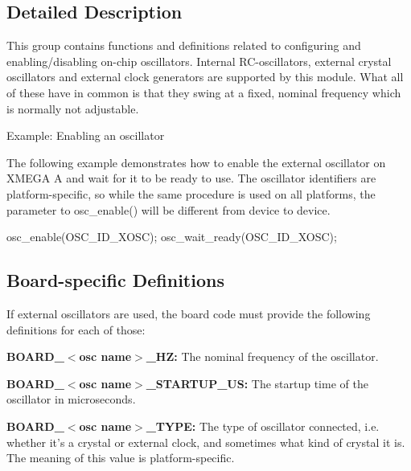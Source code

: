 \subsection{\-Detailed \-Description}
\-This group contains functions and definitions related to configuring and enabling/disabling on-\/chip oscillators. \-Internal \-R\-C-\/oscillators, external crystal oscillators and external clock generators are supported by this module. \-What all of these have in common is that they swing at a fixed, nominal frequency which is normally not adjustable.

\begin{DoxyParagraph}{\-Example\-: \-Enabling an oscillator}

\end{DoxyParagraph}
\-The following example demonstrates how to enable the external oscillator on \-X\-M\-E\-G\-A \-A and wait for it to be ready to use. \-The oscillator identifiers are platform-\/specific, so while the same procedure is used on all platforms, the parameter to osc\-\_\-enable() will be different from device to device. 
\begin{DoxyCode}
        osc_enable(OSC_ID_XOSC);
        osc_wait_ready(OSC_ID_XOSC); 
\end{DoxyCode}
\hypertarget{group__osc__group_osc_group_board}{}\subsection{\-Board-\/specific Definitions}\label{group__osc__group_osc_group_board}
\-If external oscillators are used, the board code must provide the following definitions for each of those\-:
\begin{DoxyItemize}
\item {\bfseries \-B\-O\-A\-R\-D\-\_\-$<$osc name$>$\-\_\-\-H\-Z\-:} \-The nominal frequency of the oscillator.
\item {\bfseries \-B\-O\-A\-R\-D\-\_\-$<$osc name$>$\-\_\-\-S\-T\-A\-R\-T\-U\-P\-\_\-\-U\-S\-:} \-The startup time of the oscillator in microseconds.
\item {\bfseries \-B\-O\-A\-R\-D\-\_\-$<$osc name$>$\-\_\-\-T\-Y\-P\-E\-:} \-The type of oscillator connected, i.\-e. whether it's a crystal or external clock, and sometimes what kind of crystal it is. \-The meaning of this value is platform-\/specific. 
\end{DoxyItemize}

